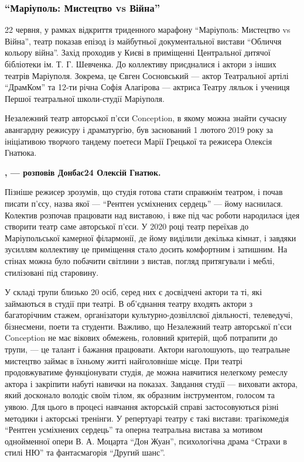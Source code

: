 \subsubsection{\enquote{Маріуполь: Мистецтво vs Війна}}

22 червня, у рамках відкриття триденного марафону \enquote{Маріуполь: Мистецтво vs
Війна}, театр показав епізод із майбутньої документальної вистави \enquote{Обличчя
кольору війна}. Захід проходив у Києві в приміщенні Центральної дитячої
бібліотеки ім. Т. Г. Шевченка. До коллективу приєдналися і актори з інших
театрів Маріуполя. Зокрема, це Євген Сосновський — актор Театральної артілі
\enquote{ДрамКом} та 12-ти річна Софія Алагірова — актриса Театру ляльок і учениця
Першої театральної школи-студії Маріуполя.

Незалежний театр авторської п'єси Conception, в якому можна знайти сучасну
авангардну режисуру і драматургію, був заснований 1 лютого 2019 року за
ініціативою творчого тандему поетеси Марії Грецької та режисера Олексія
Гнатюка. 

\begin{leftbar}
	\begingroup
		\bfseries
{}, — розповів
Донбас24 Олексій Гнатюк. 
	\endgroup
\end{leftbar}

Пізніше режисер зрозумів, що студія готова стати справжнім театром, і почав
писати п'єсу, назва якої — \enquote{Рентген усміхнених сердець} — йому наснилася.
Колектив розпочав працювати над виставою, і вже під час роботи народилася ідея
створити театр саме авторської п'єси. У 2020 році театр переїхав до
Маріупольської камерної філармонії, де йому виділили декілька кімнат, і завдяки
зусиллям коллективу це приміщення стало досить комфортним і затишним. На стінах
можна було побачити світлини з вистав, погляд притягували і меблі, стилізовані
під старовину.

У складі трупи близько 20 осіб, серед них є досвідчені актори та ті, які
займаються в студії при театрі. В об'єднання театру входять актори з
багаторічним стажем, організатори культурно-дозвіллєвої діяльності, телеведучі,
бізнесмени, поети та студенти. Важливо, що Незалежний театр авторської п'єси
Conception не має вікових обмежень, головний критерій, щоб потрапити до трупи,
— це талант і бажання працювати. Актори наголошують, що театральне мистецтво
займає в їхньому житті найголовніше місце. При театрі продовжуватиме
функціонувати студія, де можна навчитися нелегкому ремеслу актора і закріпити
набуті навички на показах. Завдання студії — виховати актора, який досконало
володіє своїм тілом, як образним інструментом, голосом та уявою. Для цього в
процесі навчання акторській справі застосовуються різні методики і акторські
тренінги. У репертуарі театру є такі вистави: трагікомедія \enquote{Рентген усміхнених
сердець} та оперна театральна вистава за мотивом однойменної опери В. А.
Моцарта \enquote{Дон Жуан}, психологічна драма \enquote{Страхи в стилі НЮ} та фантасмагорія
\enquote{Другий шанс}.

